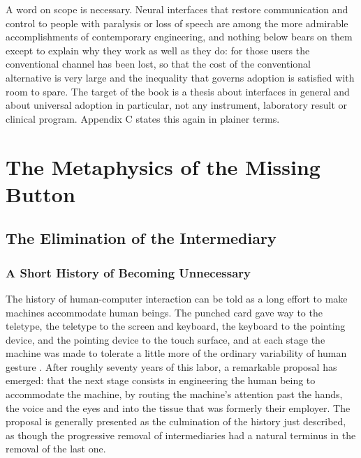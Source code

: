 \documentclass[11pt,twoside,openany]{book}
\theoremstyle{definition}
\theoremstyle{remark}
\begin{document}
A word on scope is necessary. Neural interfaces that restore communication and control to people with paralysis or loss of speech are among the more admirable accomplishments of contemporary engineering, and nothing below bears on them except to explain why they work as well as they do: for those users the conventional channel has been lost, so that the cost of the conventional alternative is very large and the inequality that governs adoption is satisfied with room to spare. The target of the book is a thesis about interfaces in general and about universal adoption in particular, not any instrument, laboratory result or clinical program. Appendix C states this again in plainer terms.

\tableofcontents

\mainmatter

\part{The Metaphysics of the Missing Button}

\chapter{The Elimination of the Intermediary}

\section{A Short History of Becoming Unnecessary}

The history of human-computer interaction can be told as a long effort to make machines accommodate human beings. The punched card gave way to the teletype, the teletype to the screen and keyboard, the keyboard to the pointing device, and the pointing device to the touch surface, and at each stage the machine was made to tolerate a little more of the ordinary variability of human gesture \cite{card1983,norman1988}. After roughly seventy years of this labor, a remarkable proposal has emerged: that the next stage consists in engineering the human being to accommodate the machine, by routing the machine's attention past the hands, the voice and the eyes and into the tissue that was formerly their employer. The proposal is generally presented as the culmination of the history just described, as though the progressive removal of intermediaries had a natural terminus in the removal of the last one.
\end{document}
